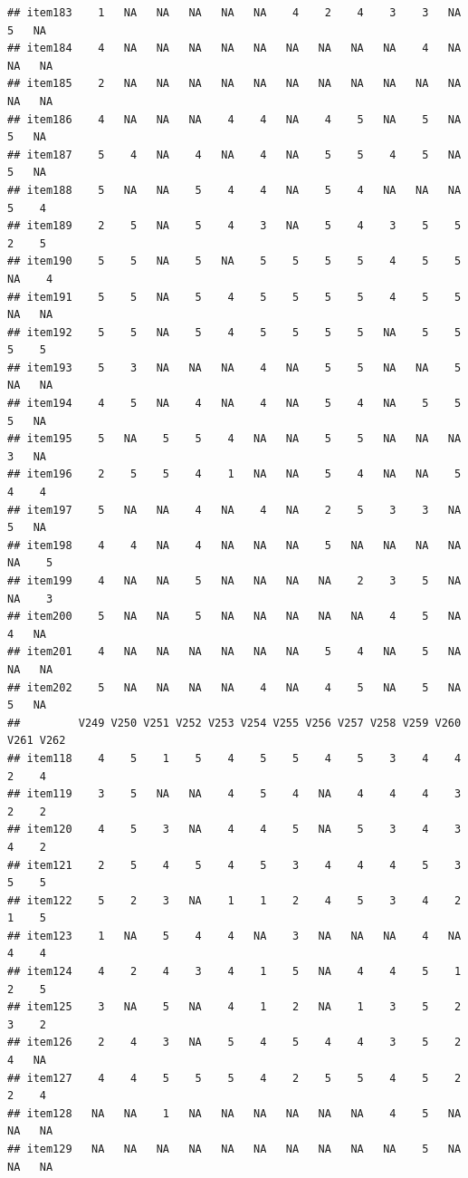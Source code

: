 \documentclass[
  man]{apa6}
\begin{document}
\begin{verbatim}
## item183    1   NA   NA   NA   NA   NA    4    2    4    3    3   NA    5   NA
## item184    4   NA   NA   NA   NA   NA   NA   NA   NA   NA    4   NA   NA   NA
## item185    2   NA   NA   NA   NA   NA   NA   NA   NA   NA   NA   NA   NA   NA
## item186    4   NA   NA   NA    4    4   NA    4    5   NA    5   NA    5   NA
## item187    5    4   NA    4   NA    4   NA    5    5    4    5   NA    5   NA
## item188    5   NA   NA    5    4    4   NA    5    4   NA   NA   NA    5    4
## item189    2    5   NA    5    4    3   NA    5    4    3    5    5    2    5
## item190    5    5   NA    5   NA    5    5    5    5    4    5    5   NA    4
## item191    5    5   NA    5    4    5    5    5    5    4    5    5   NA   NA
## item192    5    5   NA    5    4    5    5    5    5   NA    5    5    5    5
## item193    5    3   NA   NA   NA    4   NA    5    5   NA   NA    5   NA   NA
## item194    4    5   NA    4   NA    4   NA    5    4   NA    5    5    5   NA
## item195    5   NA    5    5    4   NA   NA    5    5   NA   NA   NA    3   NA
## item196    2    5    5    4    1   NA   NA    5    4   NA   NA    5    4    4
## item197    5   NA   NA    4   NA    4   NA    2    5    3    3   NA    5   NA
## item198    4    4   NA    4   NA   NA   NA    5   NA   NA   NA   NA   NA    5
## item199    4   NA   NA    5   NA   NA   NA   NA    2    3    5   NA   NA    3
## item200    5   NA   NA    5   NA   NA   NA   NA   NA    4    5   NA    4   NA
## item201    4   NA   NA   NA   NA   NA   NA    5    4   NA    5   NA   NA   NA
## item202    5   NA   NA   NA   NA    4   NA    4    5   NA    5   NA    5   NA
##         V249 V250 V251 V252 V253 V254 V255 V256 V257 V258 V259 V260 V261 V262
## item118    4    5    1    5    4    5    5    4    5    3    4    4    2    4
## item119    3    5   NA   NA    4    5    4   NA    4    4    4    3    2    2
## item120    4    5    3   NA    4    4    5   NA    5    3    4    3    4    2
## item121    2    5    4    5    4    5    3    4    4    4    5    3    5    5
## item122    5    2    3   NA    1    1    2    4    5    3    4    2    1    5
## item123    1   NA    5    4    4   NA    3   NA   NA   NA    4   NA    4    4
## item124    4    2    4    3    4    1    5   NA    4    4    5    1    2    5
## item125    3   NA    5   NA    4    1    2   NA    1    3    5    2    3    2
## item126    2    4    3   NA    5    4    5    4    4    3    5    2    4   NA
## item127    4    4    5    5    5    4    2    5    5    4    5    2    2    4
## item128   NA   NA    1   NA   NA   NA   NA   NA   NA    4    5   NA   NA   NA
## item129   NA   NA   NA   NA   NA   NA   NA   NA   NA   NA    5   NA   NA   NA

\end{verbatim}
\end{document}
